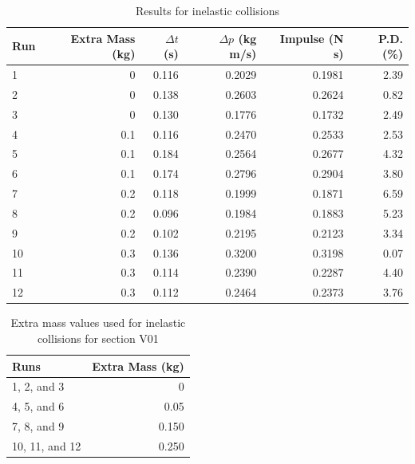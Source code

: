 \begin{table}[ht]
    \centering
    \begin{tabular}{|l|r|r|r|r|r|}
        \hline
        Run & Extra Mass (kg) & $\Delta t$ (s) & $\Delta p$ (kg m/s) & Impulse (N s) & P.D. (\%) \\  
        \hline
        1 & 0 & 0.116 & 0.2029 & 0.1981 & 2.39 \\
        2 & 0 & 0.138 & 0.2603 & 0.2624 & 0.82 \\
        3 & 0 & 0.130 & 0.1776 & 0.1732 & 2.49 \\
        \hline
        4 & 0.1 & 0.116 & 0.2470 & 0.2533 & 2.53 \\
        5 & 0.1 & 0.184 & 0.2564 & 0.2677 & 4.32 \\
        6 & 0.1 & 0.174 & 0.2796 & 0.2904 & 3.80 \\
        \hline
        7 & 0.2 & 0.118 & 0.1999 & 0.1871 & 6.59 \\
        8 & 0.2 & 0.096 & 0.1984 & 0.1883 & 5.23 \\
        9 & 0.2 & 0.102 & 0.2195 & 0.2123 & 3.34 \\
        \hline
        10 & 0.3 & 0.136 & 0.3200 & 0.3198 & 0.07 \\
        11 & 0.3 & 0.114 & 0.2390 & 0.2287 & 4.40 \\
        12 & 0.3 & 0.112 & 0.2464 & 0.2373 & 3.76 \\
        \hline
    \end{tabular}
    \caption{Results for inelastic collisions}
    \label{table:08.results.inelastic}
\end{table}
\begin{table}[ht]
    \centering
    \begin{tabular}{|l|r|}
        \hline
        Runs & Extra Mass (kg) \\
        \hline
        1, 2, and 3 & 0 \\
        4, 5, and 6 & 0.05 \\
        7, 8, and 9 & 0.150 \\
        10, 11, and 12 & 0.250 \\
        \hline
    \end{tabular}
    \caption{Extra mass values used for inelastic collisions for section V01}
    \label{table:08.inelastic.mass.v01}
\end{table}
